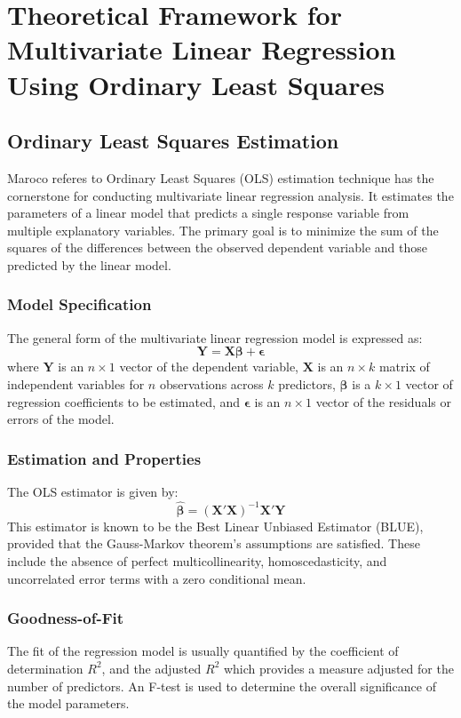 \documentclass{aip-cp}
\begin{document}
\section{Theoretical Framework for Multivariate Linear Regression Using Ordinary Least Squares}

\subsection{Ordinary Least Squares Estimation}
Maroco\cite{Maroco2010} referes to Ordinary Least Squares (OLS) estimation technique has the cornerstone for conducting multivariate linear regression analysis. It estimates the parameters of a linear model that predicts a single response variable from multiple explanatory variables. The primary goal is to minimize the sum of the squares of the differences between the observed dependent variable and those predicted by the linear model.

\subsubsection{Model Specification}
The general form of the multivariate linear regression model is expressed as:
\begin{equation}
    \mathbf{Y} = \mathbf{X\beta} + \boldsymbol{\epsilon}
\end{equation}
where $\mathbf{Y}$ is an $n \times 1$ vector of the dependent variable, $\mathbf{X}$ is an $n \times k$ matrix of independent variables for $n$ observations across $k$ predictors, $\boldsymbol{\beta}$ is a $k \times 1$ vector of regression coefficients to be estimated, and $\boldsymbol{\epsilon}$ is an $n \times 1$ vector of the residuals or errors of the model.

\subsubsection{Estimation and Properties}
The OLS estimator is given by:
\begin{equation}
    \hat{\boldsymbol{\beta}} = (\mathbf{X'X})^{-1}\mathbf{X'Y}
\end{equation}
This estimator is known to be the Best Linear Unbiased Estimator (BLUE), provided that the Gauss-Markov theorem's assumptions are satisfied. These include the absence of perfect multicollinearity, homoscedasticity, and uncorrelated error terms with a zero conditional mean.

\subsubsection{Goodness-of-Fit}
The fit of the regression model is usually quantified by the coefficient of determination $R^2$, and the adjusted $R^2$ which provides a measure adjusted for the number of predictors. An F-test is used to determine the overall significance of the model parameters.
\end{document}
